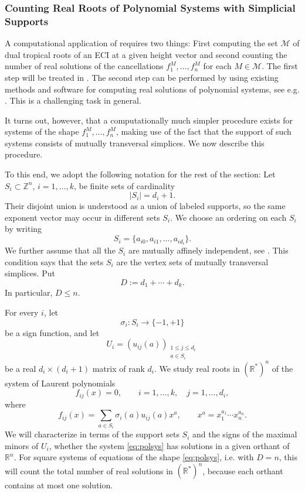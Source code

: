 \documentclass[a4paper]{article}
\theoremstyle{remark}
\def\RR{\mathbb{R}}
\def\ZZ{\mathbb{Z}}
\begin{document}
\subsubsection{Counting Real Roots of Polynomial Systems with Simplicial Supports}
\label{sec:realpatchtwo}

A computational application of  requires two
things: First computing the set $\mathcal{M}$ of dual tropical roots of an ECI
at a given height vector and second counting the number of real
solutions of the cancellations $f_1^M,\ldots, f_n^M$ for each $M\in \mathcal{M}$. The first
step will be treated in . The second step can be performed
by using existing methods and software for computing real solutions of polynomial
systems, see e.g. \cite{berthomieu2021}. This is a challenging task in general.

It turns out, however, that a computationally much simpler procedure
exists for systems of the shape $f_1^M,\ldots, f_n^M$, making use of the
fact that the support of such systems consists of mutually transversal
simplices. We now describe this procedure.

To this end, we adopt the following notation for the rest of the section:
Let $S_i\subset\ZZ^n$, $i=1,\ldots,k$, be finite sets of cardinality
$$
|S_i|=d_i+1.
$$
Their disjoint union is understood as a union of labeled supports, so
the same exponent vector may occur in different sets $S_i$. We choose
an ordering on each $S_i$ by writing
$$
S_i=\{a_{i0},a_{i1},\ldots,a_{id_i}\}.
$$
We further assume that all the $S_i$ are mutually affinely independent, see
. This condition says that the sets $S_i$ are the
vertex sets of mutually transversal simplices.
Put
$$
D:=d_1+\cdots+d_k.
$$
In particular, $D\leq n$.

For every $i$, let
$$
\sigma_i:S_i\longrightarrow\{-1,+1\}
$$
be a sign function, and let
$$
U_i=(u_{ij}(a))_{\substack{1\leq j\leq d_i\\a\in S_i}}
$$
be a real $d_i\times(d_i+1)$ matrix of rank $d_i$. We study real roots in
$(\RR^{*})^n$ of the system of Laurent polynomials
\begin{equation}
  \label{eq:polsys}
  f_{ij}(x)=0, \qquad i=1,\ldots,k,\quad j=1,\ldots,d_i,
\end{equation}
where
\begin{equation*}
  f_{ij}(x)=\sum_{a\in S_i}\sigma_i(a)u_{ij}(a)x^a,\qquad x^a=x_1^{a_1}\cdots x_n^{a_n}.
\end{equation*}
We will characterize in terms of the support sets $S_i$ and the signs
of the maximal minors of $U_i$, whether the system \eqref{eq:polsys}
has solutions in a given orthant of $\RR^n$. For square systems of
equations of the shape \eqref{eq:polsys}, i.e. with $D=n$, this will
count the total number of real solutions in $(\RR^*)^n$, because each
orthant contains at most one solution.
\end{document}
